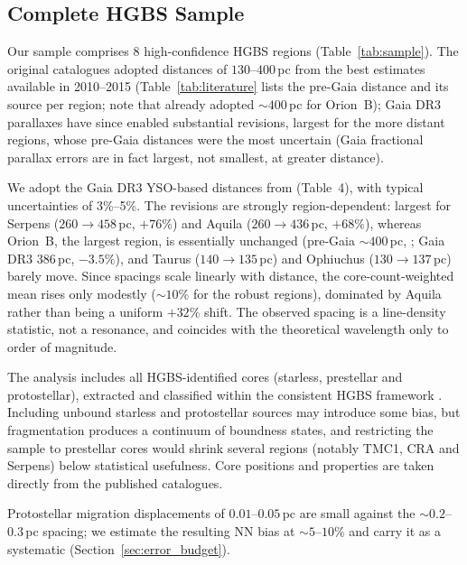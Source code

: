 \documentclass[usenatbib,twoside,twocolumn]{mnras}
\begin{document}
\subsection{Complete HGBS Sample}

Our sample comprises 8 high-confidence HGBS regions (Table~\ref{tab:sample}). The original catalogues \citep{Konyves2015, Konyves2020, Ladjelate2020, Pezzuto2021} adopted distances of $130$--$400$\,pc from the best estimates available in 2010--2015 (Table~\ref{tab:literature} lists the pre-Gaia distance and its source per region; note that \citealt{Konyves2020} already adopted $\sim400$\,pc for Orion~B); Gaia DR3 parallaxes \citep{Zhang2023} have since enabled substantial revisions, largest for the more distant regions, whose pre-Gaia distances were the most uncertain (Gaia fractional parallax errors are in fact largest, not smallest, at greater distance).

We adopt the Gaia DR3 YSO-based distances from \citet{Zhang2023} (Table~4), with typical uncertainties of 3\%--5\%. The revisions are strongly region-dependent: largest for Serpens ($260\to458$\,pc, $+76\%$) and Aquila ($260\to436$\,pc, $+68\%$), whereas Orion~B, the largest region, is essentially unchanged (pre-Gaia $\sim400$\,pc, \citealt{Konyves2020}; Gaia DR3 $386$\,pc, $-3.5\%$), and Taurus ($140\to135$\,pc) and Ophiuchus ($130\to137$\,pc) barely move. Since spacings scale linearly with distance, the core-count-weighted mean rises only modestly ($\sim10\%$ for the robust regions), dominated by Aquila rather than being a uniform $+32\%$ shift. The observed spacing is a line-density statistic, not a resonance, and coincides with the theoretical wavelength only to order of magnitude.

The analysis includes all HGBS-identified cores (starless, prestellar and protostellar), extracted and classified within the consistent HGBS framework \citep{Konyves2015, Konyves2020}. Including unbound starless and protostellar sources may introduce some bias, but fragmentation produces a continuum of boundness states, and restricting the sample to prestellar cores would shrink several regions (notably TMC1, CRA and Serpens) below statistical usefulness. Core positions and properties are taken directly from the published catalogues.

Protostellar migration displacements of $0.01$--$0.05$\,pc \citep{Kirk2016, Mattern2018} are small against the $\sim0.2$--$0.3$\,pc spacing; we estimate the resulting NN bias at $\sim5$--$10\%$ and carry it as a systematic (Section~\ref{sec:error_budget}).
\end{document}
